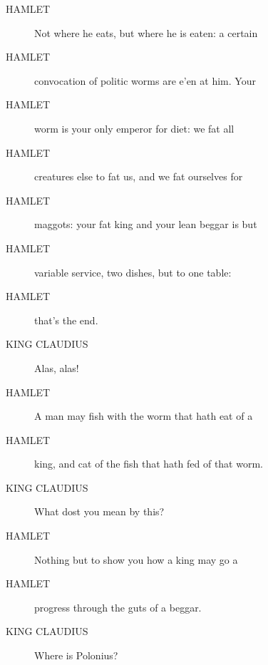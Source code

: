 \documentclass{article}
\begin{document}
\begin{description}
            
\item[HAMLET] Not where he eats, but where he is eaten: a certain
\item[HAMLET] convocation of politic worms are e'en at him. Your
\item[HAMLET] worm is your only emperor for diet: we fat all
\item[HAMLET] creatures else to fat us, and we fat ourselves for
\item[HAMLET] maggots: your fat king and your lean beggar is but
\item[HAMLET] variable service, two dishes, but to one table:
\item[HAMLET] that's the end.
\end{description}
          
\begin{description}
            
\item[KING CLAUDIUS] Alas, alas!
\end{description}
          
\begin{description}
            
\item[HAMLET] A man may fish with the worm that hath eat of a
\item[HAMLET] king, and cat of the fish that hath fed of that worm.
\end{description}
          
\begin{description}
            
\item[KING CLAUDIUS] What dost you mean by this?
\end{description}
          
\begin{description}
            
\item[HAMLET] Nothing but to show you how a king may go a
\item[HAMLET] progress through the guts of a beggar.
\end{description}
          
\begin{description}
            
\item[KING CLAUDIUS] Where is Polonius?
\end{description}
          
\end{document}

